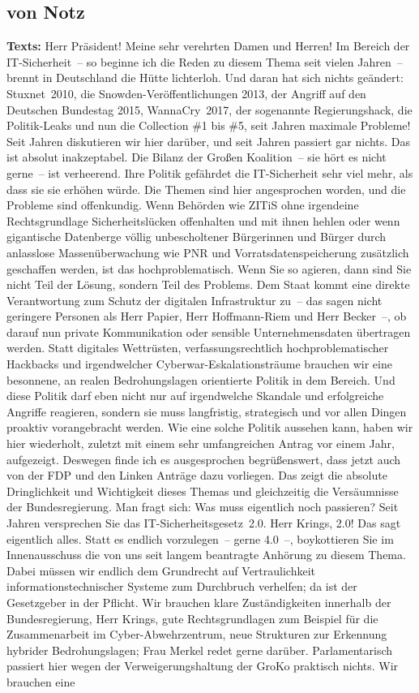 \documentclass{article}
\begin{document}
\subsection{von Notz}
\noindent\textbf{Texts:} Herr Präsident! Meine sehr verehrten Damen und Herren! Im Bereich der IT-Sicherheit – so beginne ich die Reden zu diesem Thema seit vielen Jahren – brennt in Deutschland die Hütte lichterloh. Und daran hat sich nichts geändert: Stuxnet 2010, die Snowden-Veröffentlichungen 2013, der Angriff auf den Deutschen Bundestag 2015, WannaCry 2017, der sogenannte Regierungshack, die Politik-Leaks und nun die Collection \#1 bis \#5, seit Jahren maximale Probleme! Seit Jahren diskutieren wir hier darüber, und seit Jahren passiert gar nichts. Das ist absolut inakzeptabel.  Die Bilanz der Großen Koalition – sie hört es nicht gerne – ist verheerend. Ihre Politik gefährdet die IT-Sicherheit sehr viel mehr, als dass sie sie erhöhen würde. Die Themen sind hier angesprochen worden, und die Probleme sind offenkundig. Wenn Behörden wie ZITiS ohne irgendeine Rechtsgrundlage  Sicherheitslücken offenhalten und mit ihnen hehlen oder wenn gigantische Datenberge völlig unbescholtener Bürgerinnen und Bürger durch anlasslose Massenüberwachung wie PNR und Vorratsdatenspeicherung zusätzlich geschaffen werden, ist das hochproblematisch. Wenn Sie so agieren, dann sind Sie nicht Teil der Lösung, sondern Teil des Problems.  Dem Staat kommt eine direkte Verantwortung zum Schutz der digitalen Infrastruktur zu – das sagen nicht geringere Personen als Herr Papier, Herr Hoffmann-Riem und Herr Becker –, ob darauf nun private Kommunikation oder sensible Unternehmensdaten übertragen werden. Statt digitales Wettrüsten, verfassungsrechtlich hochproblematischer Hackbacks und irgendwelcher Cyberwar-Eskalationsträume brauchen wir eine besonnene, an realen Bedrohungslagen orientierte Politik in dem Bereich. Und diese Politik darf eben nicht nur auf irgendwelche Skandale und erfolgreiche Angriffe reagieren, sondern sie muss langfristig, strategisch und vor allen Dingen proaktiv vorangebracht werden.  Wie eine solche Politik aussehen kann, haben wir hier wiederholt, zuletzt mit einem sehr umfangreichen Antrag vor einem Jahr, aufgezeigt. Deswegen finde ich es ausgesprochen begrüßenswert, dass jetzt auch von der FDP und den Linken Anträge dazu vorliegen. Das zeigt die absolute Dringlichkeit und Wichtigkeit dieses Themas und gleichzeitig die Versäumnisse der Bundesregierung.  Man fragt sich: Was muss eigentlich noch passieren? Seit Jahren versprechen Sie das IT-Sicherheitsgesetz 2.0. Herr Krings, 2.0! Das sagt eigentlich alles.  Statt es endlich vorzulegen – gerne 4.0 –,  boykottieren Sie im Innenausschuss die von uns seit langem beantragte Anhörung zu diesem Thema. Dabei müssen wir endlich dem Grundrecht auf Vertraulichkeit informationstechnischer Systeme zum Durchbruch verhelfen; da ist der Gesetzgeber in der Pflicht. Wir brauchen klare Zuständigkeiten innerhalb der Bundesregierung, Herr Krings, gute Rechtsgrundlagen zum Beispiel für die Zusammenarbeit im Cyber-Abwehrzentrum,  neue Strukturen zur Erkennung hybrider Bedrohungslagen; Frau Merkel redet gerne darüber. Parlamentarisch passiert hier wegen der Verweigerungshaltung der GroKo praktisch nichts. Wir brauchen eine 
\end{document}
